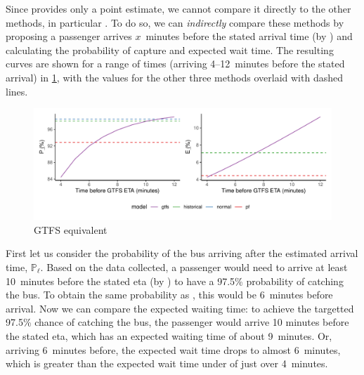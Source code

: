 Since \Fsched{} provides only a point estimate, we cannot compare it directly to the other methods, in particular \Fpf{}. To do so, we can \emph{indirectly} compare these methods by proposing a passenger arrives $x$~minutes before the stated arrival time (by \Fsched{}) and calculating the probability of capture and expected wait time. The resulting curves are shown for a range of times (arriving 4--12~minutes before the stated arrival) in \cref{fig:model_results_pr_gtfs}, with the values for the other three methods overlaid with dashed lines.



\begin{knitrout}\small
{}\color{fgcolor}\begin{figure}

{\centering \includegraphics[width=\textwidth]{figure/model_results_pr_gtfs-1} 

}

\caption[GTFS equivalent]{GTFS equivalent}\label{fig:model_results_pr_gtfs}
\end{figure}


\end{knitrout}



First let us consider the probability of the bus arriving after the estimated arrival time, $\mathbb{P}_\ell$. Based on the data collected, a passenger would need to arrive at least 10~minutes before the stated \gls{eta} (by \Fsched{}) to have a 97.5\% probability of catching the bus. To obtain the same probability as \Fpf{}, this would be 6~minutes before arrival. Now we can compare the expected waiting time: to achieve the targetted 97.5\% chance of catching the bus, the passenger would arrive 10 minutes before the stated \gls{eta}, which has an expected waiting time of about 9~minutes. Or, arriving 6~minutes before, the expected wait time drops to almost 6~minutes, which is greater than the expected wait time under \Fpf{} of just over 4~minutes.


